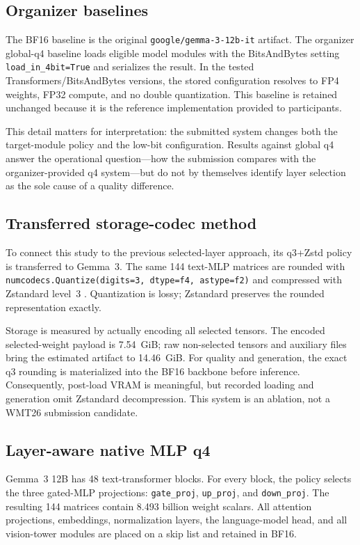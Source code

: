 \documentclass[11pt]{article}
\begin{document}
\subsection{Organizer baselines}

The BF16 baseline is the original \texttt{google/gemma-3-12b-it} artifact. The organizer global-q4 baseline loads eligible model modules with the BitsAndBytes setting \texttt{load\_in\_4bit=True} and serializes the result. In the tested Transformers/BitsAndBytes versions, the stored configuration resolves to FP4 weights, FP32 compute, and no double quantization. This baseline is retained unchanged because it is the reference implementation provided to participants.

This detail matters for interpretation: the submitted system changes both the target-module policy and the low-bit configuration. Results against global q4 answer the operational question---how the submission compares with the organizer-provided q4 system---but do not by themselves identify layer selection as the sole cause of a quality difference.

\subsection{Transferred storage-codec method}

To connect this study to the previous selected-layer approach, its q3+Zstd policy is transferred to Gemma~3. The same 144 text-MLP matrices are rounded with \texttt{numcodecs.Quantize(digits=3, dtype=f4, astype=f2)} and compressed with Zstandard level~3 \citep{alted-etal-2016-numcodecs,palomino-2026-selected}. Quantization is lossy; Zstandard preserves the rounded representation exactly.

Storage is measured by actually encoding all selected tensors. The encoded selected-weight payload is 7.54~GiB; raw non-selected tensors and auxiliary files bring the estimated artifact to 14.46~GiB. For quality and generation, the exact q3 rounding is materialized into the BF16 backbone before inference. Consequently, post-load VRAM is meaningful, but recorded loading and generation omit Zstandard decompression. This system is an ablation, not a WMT26 submission candidate.

\subsection{Layer-aware native MLP q4}

Gemma~3 12B has 48 text-transformer blocks. For every block, the policy selects the three gated-MLP projections: \texttt{gate\_proj}, \texttt{up\_proj}, and \texttt{down\_proj}. The resulting 144 matrices contain 8.493 billion weight scalars. All attention projections, embeddings, normalization layers, the language-model head, and all vision-tower modules are placed on a skip list and retained in BF16.
\end{document}
